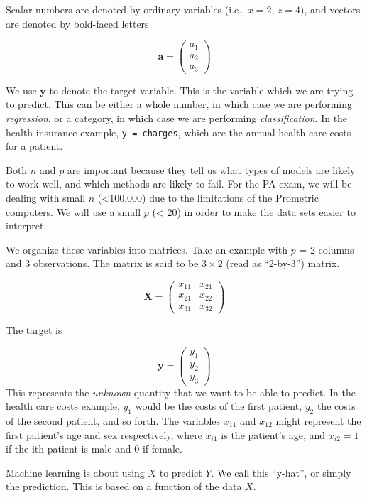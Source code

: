\documentclass[openany]{book}
\begin{document}
Scalar numbers are denoted by ordinary variables (i.e., \(x = 2\), \(z = 4\)), and vectors are denoted by bold-faced letters

\[\mathbf{a} = \begin{pmatrix} a_1 \\ a_2 \\ a_3 \end{pmatrix}\]

We use \(\mathbf{y}\) to denote the target variable. This is the variable which we are trying to predict. This can be either a whole number, in which case we are performing \emph{regression}, or a category, in which case we are performing \emph{classification}. In the health insurance example, \texttt{y\ =\ charges}, which are the annual health care costs for a patient.

Both \(n\) and \(p\) are important because they tell us what types of models are likely to work well, and which methods are likely to fail. For the PA exam, we will be dealing with small \(n\) (\textless100,000) due to the limitations of the Prometric computers. We will use a small \(p\) (\textless{} 20) in order to make the data sets easier to interpret.

We organize these variables into matrices. Take an example with \(p\) = 2 columns and 3 observations. The matrix is said to be \(3 \times 2\) (read as ``2-by-3'') matrix.

\[
\mathbf{X} = \begin{pmatrix}x_{11} & x_{21}\\
x_{21} & x_{22}\\
x_{31} & x_{32}
\end{pmatrix}
\]

The target is

\[\mathbf{y} = \begin{pmatrix} y_1 \\ y_2 \\ y_3 \end{pmatrix}\]
This represents the \emph{unknown} quantity that we want to be able to predict. In the health care costs example, \(y_1\) would be the costs of the first patient, \(y_2\) the costs of the second patient, and so forth. The variables \(x_{11}\) and \(x_{12}\) might represent the first patient's age and sex respectively, where \(x_{i1}\) is the patient's age, and \(x_{i2} = 1\) if the ith patient is male and 0 if female.

Machine learning is about using \(X\) to predict \(Y\). We call this ``y-hat'', or simply the prediction. This is based on a function of the data \(X\).
\end{document}
